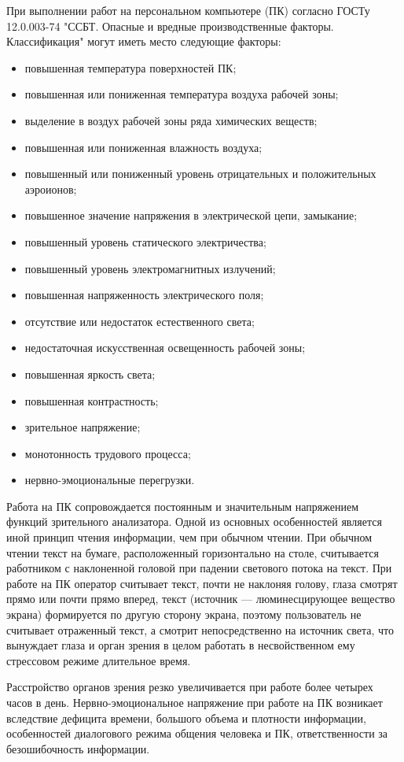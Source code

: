 При выполнении работ на персональном компьютере (ПК) согласно ГОСТу 12.0.003-74 "ССБТ. Опасные и вредные производственные факторы. Классификация" могут иметь место следующие факторы:
\begin{itemize}
	\item повышенная температура поверхностей ПК;
	\item повышенная или пониженная температура воздуха рабочей зоны;
	\item выделение в воздух рабочей зоны ряда химических веществ;
	\item повышенная или пониженная влажность воздуха;
	\item повышенный или пониженный уровень отрицательных и положительных аэроионов;
	\item повышенное значение напряжения в электрической цепи, замыкание;
	\item повышенный уровень статического электричества;
	\item повышенный уровень электромагнитных излучений;
	\item повышенная напряженность электрического поля;
	\item отсутствие или недостаток естественного света;
	\item недостаточная искусственная освещенность рабочей зоны;
	\item повышенная яркость света;
	\item повышенная контрастность;
	\item зрительное напряжение;
	\item монотонность трудового процесса;
	\item нервно-эмоциональные перегрузки.
\end{itemize}
Работа на ПК сопровождается постоянным и значительным напряжением функций зрительного анализатора. Одной из основных особенностей является иной принцип чтения информации, чем при обычном чтении. При обычном чтении текст на бумаге, расположенный горизонтально на столе, считывается работником с наклоненной головой при падении светового потока на текст. При работе на ПК оператор считывает текст, почти не наклоняя голову, глаза смотрят прямо или почти прямо вперед, текст (источник — люминесцирующее вещество экрана) формируется по другую сторону экрана, поэтому пользователь не считывает отраженный текст, а смотрит непосредственно на источник света, что вынуждает глаза и орган зрения в целом работать в несвойственном ему стрессовом режиме длительное время.

Расстройство органов зрения резко увеличивается при работе более четырех часов в день. Нервно-эмоциональное напряжение при работе на ПК возникает вследствие дефицита времени, большого объема и плотности информации, особенностей диалогового режима общения человека и ПК, ответственности за безошибочность информации.

